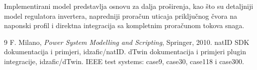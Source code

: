 \documentclass[12pt,a4paper]{article}
\begin{document}
Implementirani model predstavlja osnovu za dalja proširenja, kao što su detaljniji model regulatora invertera, napredniji proračun uticaja priključnog čvora na naponski profil i direktna integracija sa kompletnim proračunom tokova snaga.

\clearpage
\begin{thebibliography}{9}
 F. Milano, \textit{Power System Modelling and Scripting}, Springer, 2010.
 natID SDK dokumentacija i primjeri, idzafic/natID.
 dTwin dokumentacija i primjeri plugin integracije, idzafic/dTwin.
 IEEE test systems: case9, case30, case118 i case300.
\end{thebibliography}
\end{document}
